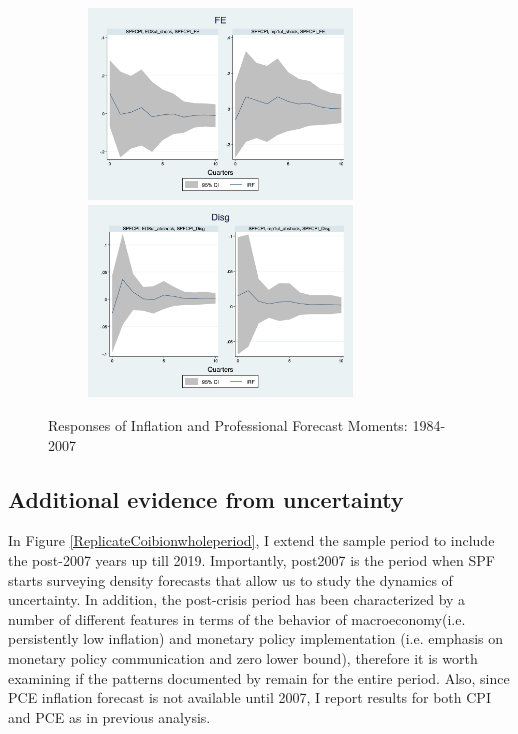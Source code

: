 \documentclass[12pt]{article}
\begin{document}
\begin{figure}[ht]
\begin{subfigure}[b]{0.5\textwidth}
		\smallskip
		\includegraphics[width=7cm]{figures/SPFFE_ashocks_before2007.png} 
		\smallskip
		\includegraphics[width=7cm]{figures/SPFDisg_ab_ashocks_before2007.png} 
	\end{subfigure}
	\caption{Responses of Inflation and Professional Forecast Moments: 1984-2007}
	\label{ReplicateCoibionBefore2007}
\end{figure}

	
	\subsection{Additional evidence from uncertainty}
	
	In Figure \ref{ReplicateCoibionwholeperiod}, I extend the sample period to include the post-2007 years up till 2019. Importantly, post2007 is the period when SPF starts surveying density forecasts that allow us to study the dynamics of uncertainty. In addition, the post-crisis period has been characterized by a number of different features in terms of the behavior of macroeconomy(i.e. persistently low inflation) and monetary policy implementation (i.e. emphasis on monetary policy communication and zero lower bound), therefore it is worth examining if the patterns documented by \cite{coibion2012can} remain for the entire period. Also, since PCE inflation forecast is not available until 2007, I report results for both CPI and PCE as in previous analysis. 
	
\end{document}
